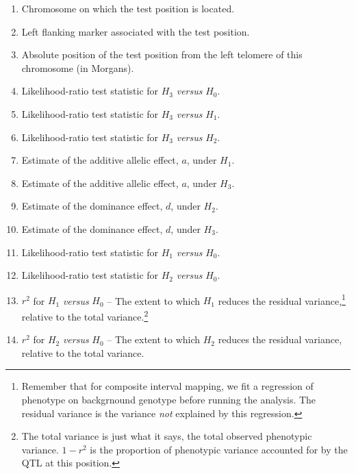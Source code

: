 \documentclass[12pt]{article}
\begin{document}
\begin{enumerate}

\item Chromosome on which the test position is located.

\item Left flanking marker associated with the test position.

\item Absolute position of the test position from the left telomere of
  this chromosome (in Morgans).

\item Likelihood-ratio test statistic for $H_3$ {\it versus\/} $H_0$. 

\item Likelihood-ratio test statistic for $H_3$ {\it versus\/} $H_1$. 

\item Likelihood-ratio test statistic for $H_3$ {\it versus\/} $H_2$. 

\item Estimate of the additive allelic effect, $a$, under $H_1$.

\item Estimate of the additive allelic effect, $a$, under $H_3$.

\item Estimate of the dominance effect, $d$, under $H_2$.

\item Estimate of the dominance effect, $d$, under $H_3$.

\item Likelihood-ratio test statistic for $H_1$ {\it versus\/} $H_0$. 

\item Likelihood-ratio test statistic for $H_2$ {\it versus\/} $H_0$. 

\item $r^2$ for $H_1$ {\it versus\/} $H_0$ -- The extent to which
  $H_1$ reduces the residual variance,\footnote{Remember that for
    composite interval mapping, we fit a regression of phenotype on
    backgrnound genotype before running the analysis. The residual
    variance is the variance {\it not\/} explained by this
    regression.} relative to the total variance.\footnote{The total
    variance is just what it says, the total observed phenotypic
    variance. $1-r^2$ is the proportion of phenotypic variance
    accounted for by the QTL at this position.}

\item $r^2$ for $H_2$ {\it versus\/} $H_0$ -- The extent to which
  $H_2$ reduces the residual variance, relative to the total
  variance. 


\end{enumerate}
\end{document}
